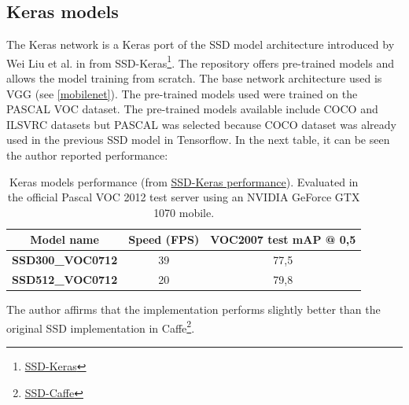 \subsection{Keras models} \label{keras_models}
The Keras network is a Keras port of the SSD model architecture introduced by Wei Liu et al. in \cite{liu2016ssd} from SSD-Keras\footnote{\href{https://github.com/pierluigiferrari/ssd_keras}{SSD-Keras}}. The repository offers pre-trained models and allows the model training from scratch. The base network architecture used is VGG (see \ref{mobilenet}). The pre-trained models used were trained on the PASCAL VOC dataset. The pre-trained models available include COCO and ILSVRC datasets but PASCAL was selected because COCO dataset was already used in the previous SSD model in Tensorflow. In the next table, it can be seen the author reported performance:
\begin{table}[H]
\begin{center}
\begin{tabular}{|c|c|c|}
\hline
Model name               & Speed (FPS) & VOC2007 test mAP @ 0,5 \\ \hline
\textbf{SSD300\_VOC0712} & 39          & 77,5                   \\ \hline
\textbf{SSD512\_VOC0712} & 20          & 79,8                   \\ \hline
\end{tabular}
\end{center}
\caption{Keras models performance (from \href{https://github.com/pierluigiferrari/ssd_keras#performance}{SSD-Keras performance}). Evaluated in the official Pascal VOC 2012 test server using an NVIDIA GeForce GTX 1070 mobile.}
\end{table}
The author affirms that the implementation performs slightly better than the original SSD implementation in Caffe\footnote{\href{https://github.com/weiliu89/caffe/tree/ssd}{SSD-Caffe}}.

